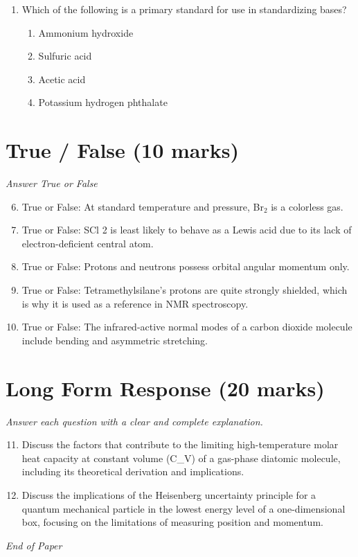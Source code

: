 \documentclass[12pt]{article}
\begin{document}
\begin{enumerate}[label=\arabic*.]
\begin{enumerate}[label=(\alph*)]
    \item mixture of two diastereomers in equal amounts
    \item meso compound
\end{enumerate}
\item Which of the following is a primary standard for use in standardizing bases?
\begin{enumerate}[label=(\alph*)]
    \item Ammonium hydroxide
    \item Sulfuric acid
    \item Acetic acid
    \item Potassium hydrogen phthalate
\end{enumerate}
\end{enumerate}

\section*{True / False (10 marks)}
\textit{Answer True or False}
\begin{enumerate}[label=\arabic*.]
\setcounter{enumi}{5}
\item True or False: At standard temperature and pressure, Br$_{2}$ is a colorless gas.
\item True or False: SCl 2 is least likely to behave as a Lewis acid due to its lack of electron-deficient central atom.
\item True or False: Protons and neutrons possess orbital angular momentum only.
\item True or False: Tetramethylsilane's protons are quite strongly shielded, which is why it is used as a reference in NMR spectroscopy.
\item True or False: The infrared-active normal modes of a carbon dioxide molecule include bending and asymmetric stretching.
\end{enumerate}

\section*{Long Form Response (20 marks)}
\textit{Answer each question with a clear and complete explanation.}
\begin{enumerate}[label=\arabic*.]
\setcounter{enumi}{10}
\item Discuss the factors that contribute to the limiting high-temperature molar heat capacity at constant volume (C\_V) of a gas-phase diatomic molecule, including its theoretical derivation and implications.
\item Discuss the implications of the Heisenberg uncertainty principle for a quantum mechanical particle in the lowest energy level of a one-dimensional box, focusing on the limitations of measuring position and momentum.
\end{enumerate}

\vfill
\noindent\textit{End of Paper}
\end{document}
